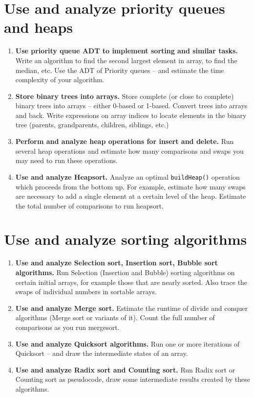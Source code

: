 \documentclass[a4paper,12pt]{article}
\begin{document}
\section{Use and analyze priority queues and heaps}

\begin{enumerate}[label=4.\Alph*.]
\item {\bf Use priority queue ADT to implement sorting and similar tasks.}
Write an algorithm to find the second largest
element in array, to find the median, etc. Use the ADT of Priority queues -- and estimate
the time complexity of your algorithm. 
\item {\bf Store binary trees into arrays.}
Store complete (or close to complete) binary trees into arrays -- either 0-based or 1-based. 
Convert trees into arrays and back. Write expressions on array indices to locate
elements in the binary tree (parents, grandparents, children, siblings, etc.)
\item {\bf Perform and analyze heap operations for insert and delete.}
Run several heap operations and estimate how many comparisons and swaps you may need to 
run these operations.
\item {\bf Use and analyze Heapsort.} 
Analyze an optimal {\tt buildHeap()} operation which proceeds from the bottom up. 
For example, estimate how many swaps are necessary 
to add a single element at a certain level of the heap. 
Estimate the total number of comparisons to run heapsort. 
\end{enumerate}

\section{Use and analyze sorting algorithms}

\begin{enumerate}[label=5.\Alph*.]
\item {\bf Use and analyze Selection sort, Insertion sort, Bubble sort algorithms.}
Run Selection (Insertion and Bubble) sorting algorithms on certain initial arrays, 
for example those that are nearly sorted. Also trace the swaps of individual numbers
in sortable arrays.
\item {\bf Use and analyze Merge sort.}
Estimate the runtime of divide and conquer algorithms (Merge sort or variants of it).
Count the full number of comparisons as you run mergesort. 
\item {\bf Use and analyze Quicksort algorithms.}
Run one or more iterations of Quicksort -- and draw the intermediate states of an array. 
\item {\bf Use and analyze Radix sort and Counting sort.}
Run Radix sort or Counting sort as pseudocode, draw some intermediate results created 
by these algorithms.
\end{enumerate}
\end{document}
